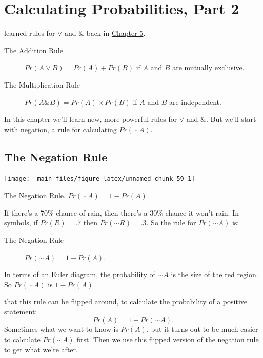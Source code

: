 \documentclass[justified]{tufte-book}
\renewcommand{\neg}{\mathbin{\sim}}
\renewcommand{\wedge}{\mathbin{\&}}
\newcommand{\p}{Pr}
\theoremstyle{definition}
\theoremstyle{definition}
\theoremstyle{definition}
\theoremstyle{definition}
\theoremstyle{remark}
\begin{document}
\hypertarget{calculating-probabilities-part-2}{%
\chapter{Calculating Probabilities, Part 2}\label{calculating-probabilities-part-2}}

 learned rules for \(\vee\) and \(\wedge\) back in \protect\hyperlink{calculating-probabilities}{Chapter 5}.

\begin{description}
\item[The Addition Rule]
\(\p(A \vee B) = \p(A) + \p(B)\) if \(A\) and \(B\) are mutually exclusive.
\item[The Multiplication Rule]
\(\p(A \& B) = \p(A) \times \p(B)\) if \(A\) and \(B\) are independent.
\end{description}

In this chapter we'll learn new, more powerful rules for \(\vee\) and \(\wedge\). But we'll start with negation, a rule for calculating \(\p(\neg A)\).

\hypertarget{the-negation-rule}{%
\section{The Negation Rule}\label{the-negation-rule}}

\begin{marginfigure}
\texttt{[image: \_main\_files/figure-latex/unnamed-chunk-59-1]} \caption[The Negation Rule]{The Negation Rule. $\p(\neg A) = 1 - \p(A)$.}\label{fig:unnamed-chunk-59}
\end{marginfigure}

If there's a 70\% chance of rain, then there's a 30\% chance it won't rain. In symbols, if \(\p(R) = .7\) then \(\p(\neg R) = .3\). So the rule for \(\p(\neg A)\) is:

\begin{description}
\item[The Negation Rule]
\(\p(\neg A) = 1 - \p(A)\).
\end{description}

In terms of an Euler diagram, the probability of \(\neg A\) is the size of the red region. So \(\p(\neg A)\) is \(1 - \p(A)\).

 that this rule can be flipped around, to calculate the probability of a positive statement:
\[ 
  \p(A) = 1 - \p(\neg A).
\]
Sometimes what we want to know is \(\p(A)\), but it turns out to be much easier to calculate \(\p(\neg A)\) first. Then we use this flipped version of the negation rule to get what we're after.
\end{document}

